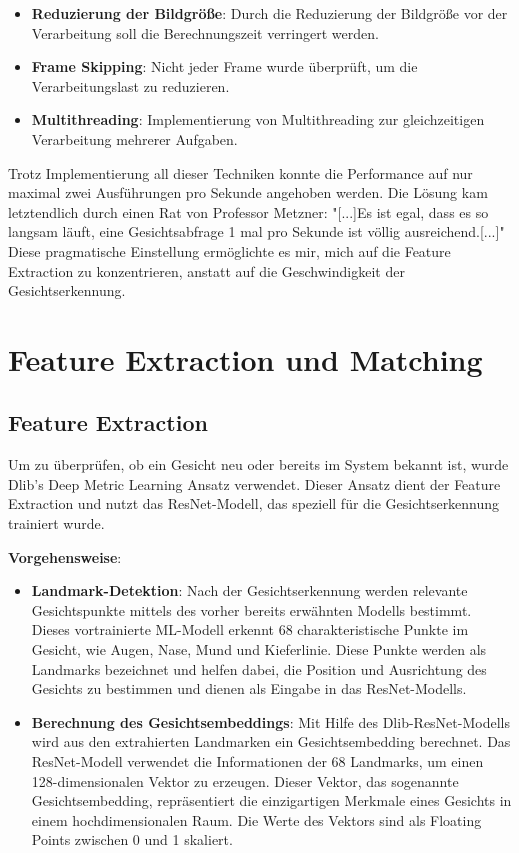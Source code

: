\begin{itemize}
    \item \textbf{Reduzierung der Bildgröße}: Durch die Reduzierung der Bildgröße vor der Verarbeitung soll die Berechnungszeit verringert werden.
    \item \textbf{Frame Skipping}: Nicht jeder Frame wurde überprüft, um die Verarbeitungslast zu reduzieren.
    \item \textbf{Multithreading}: Implementierung von Multithreading zur gleichzeitigen Verarbeitung mehrerer Aufgaben.
\end{itemize}

\noindent Trotz Implementierung all dieser Techniken konnte die Performance auf nur maximal zwei Ausführungen pro Sekunde angehoben werden. Die Lösung kam letztendlich durch einen Rat von Professor Metzner: "[...]Es ist egal, dass es so langsam läuft, eine Gesichtsabfrage 1 mal pro Sekunde ist völlig ausreichend.[...]" Diese pragmatische Einstellung ermöglichte es mir, mich auf die Feature Extraction zu konzentrieren, anstatt auf die Geschwindigkeit der Gesichtserkennung. 


\section{Feature Extraction und Matching}

\subsection{Feature Extraction}
Um zu überprüfen, ob ein Gesicht neu oder bereits im System bekannt ist, wurde Dlib's Deep Metric Learning Ansatz verwendet. Dieser Ansatz dient der Feature Extraction und nutzt das ResNet-Modell, das speziell für die Gesichtserkennung trainiert wurde.

\noindent \textbf{Vorgehensweise}:
\begin{itemize}
    \item \textbf{Landmark-Detektion}: Nach der Gesichtserkennung werden relevante Gesichtspunkte mittels des vorher bereits erwähnten Modells bestimmt. Dieses vortrainierte ML-Modell erkennt 68 charakteristische Punkte im Gesicht, wie Augen, Nase, Mund und Kieferlinie. Diese Punkte werden als Landmarks bezeichnet und helfen dabei, die Position und Ausrichtung des Gesichts zu bestimmen und dienen als Eingabe in das ResNet-Modells.
    
    \item \textbf{Berechnung des Gesichtsembeddings}: Mit Hilfe des Dlib-ResNet-Modells wird aus den extrahierten Landmarken ein Gesichtsembedding berechnet. Das ResNet-Modell verwendet die Informationen der 68 Landmarks, um einen 128-dimensionalen Vektor zu erzeugen. Dieser Vektor, das sogenannte Gesichtsembedding, repräsentiert die einzigartigen Merkmale eines Gesichts in einem hochdimensionalen Raum. Die Werte des Vektors sind als Floating Points zwischen 0 und 1 skaliert.
\end{itemize}

